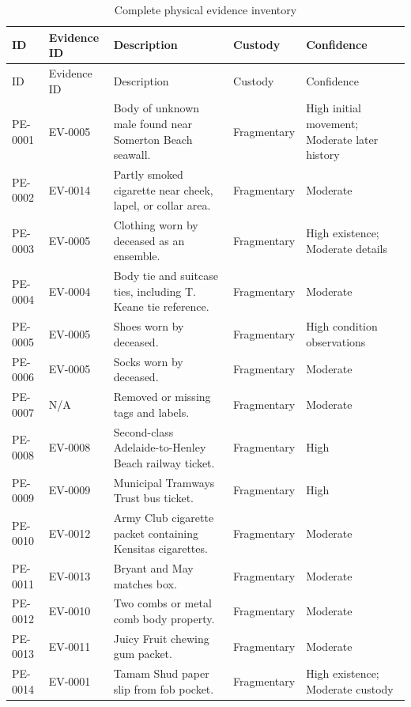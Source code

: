 \begingroup
\scriptsize
\setlength{\tabcolsep}{2pt}
\renewcommand{\arraystretch}{1.12}
\begin{longtable}{>{\raggedright\arraybackslash}p{}>{\raggedright\arraybackslash}p{}>{\raggedright\arraybackslash}p{}>{\raggedright\arraybackslash}p{}>{\raggedright\arraybackslash}p{}}
\caption{Complete physical evidence inventory}\label{tab:complete-physical-evidence-inventory}\\
\toprule
ID & Evidence ID & Description & Custody & Confidence \\
\midrule
\endfirsthead
\toprule
ID & Evidence ID & Description & Custody & Confidence \\
\midrule
\endhead
PE-0001 & EV-0005 & Body of unknown male found near Somerton Beach seawall. & Fragmentary & High initial movement; Moderate later history \\
PE-0002 & EV-0014 & Partly smoked cigarette near cheek, lapel, or collar area. & Fragmentary & Moderate \\
PE-0003 & EV-0005 & Clothing worn by deceased as an ensemble. & Fragmentary & High existence; Moderate details \\
PE-0004 & EV-0004 & Body tie and suitcase ties, including T. Keane tie reference. & Fragmentary & Moderate \\
PE-0005 & EV-0005 & Shoes worn by deceased. & Fragmentary & High condition observations \\
PE-0006 & EV-0005 & Socks worn by deceased. & Fragmentary & Moderate \\
PE-0007 & N/A & Removed or missing tags and labels. & Fragmentary & Moderate \\
PE-0008 & EV-0008 & Second-class Adelaide-to-Henley Beach railway ticket. & Fragmentary & High \\
PE-0009 & EV-0009 & Municipal Tramways Trust bus ticket. & Fragmentary & High \\
PE-0010 & EV-0012 & Army Club cigarette packet containing Kensitas cigarettes. & Fragmentary & Moderate \\
PE-0011 & EV-0013 & Bryant and May matches box. & Fragmentary & Moderate \\
PE-0012 & EV-0010 & Two combs or metal comb body property. & Fragmentary & Moderate \\
PE-0013 & EV-0011 & Juicy Fruit chewing gum packet. & Fragmentary & Moderate \\
PE-0014 & EV-0001 & Tamam Shud paper slip from fob pocket. & Fragmentary & High existence; Moderate custody \\

\end{longtable}
